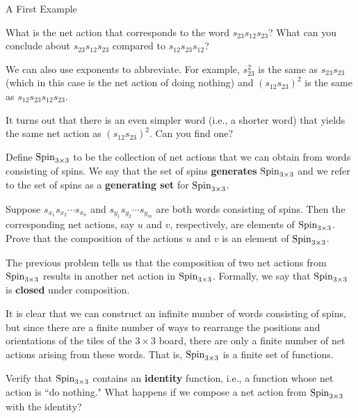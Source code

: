 \begin{section}{A First Example}
\begin{problem}
What is the net action that corresponds to the word $s_{23} s_{12} s_{23}$? What can you conclude about $s_{23} s_{12} s_{23}$ compared to 
$s_{12} s_{23} s_{12}$?
\end{problem}

We can also use exponents to abbreviate.  For example, $s_{23}^2$ is the same as $s_{23} s_{23}$ (which in this case is the net action of doing nothing) and $(s_{12} s_{23})^2$ is the same as $s_{12} s_{23} s_{12} s_{23}$.

\begin{problem}\label{prob:braid_relation}
It turns out that there is an even simpler word (i.e., a shorter word) that yields the same net action as $(s_{12} s_{23})^2$. Can you find one?
\end{problem}

Define $\operatorname{Spin}_{3\times 3}$ to be the collection of net actions that we can obtain from words consisting of spins.  We say that the set of spins \textbf{generates} $\operatorname{Spin}_{3\times 3}$ and we refer to the set of spins as a \textbf{generating set} for $\operatorname{Spin}_{3\times 3}$.  

\begin{problem}
Suppose $s_{x_1}s_{x_2}\cdots s_{x_n}$ and $s_{y_1}s_{y_2}\cdots s_{y_m}$ are both words consisting of spins. Then the corresponding net actions, say $u$ and $v$, respectively, are elements of $\operatorname{Spin}_{3\times 3}$. Prove that the composition of the actions $u$ and $v$ is an element of $\operatorname{Spin}_{3\times 3}$.
\end{problem}

The previous problem tells us that the composition of two net actions from $\operatorname{Spin}_{3\times 3}$ results in another net action in $\operatorname{Spin}_{3\times 3}$. Formally, we say that $\operatorname{Spin}_{3\times 3}$ is \textbf{closed} under composition.

It is clear that we can construct an infinite number of words consisting of spins, but since there are a finite number of ways to rearrange the positions and orientations of the tiles of the $3\times 3$ board, there are only a finite number of net actions arising from these words.  That is, $\operatorname{Spin}_{3\times 3}$ is a finite set of functions.

\begin{problem}
Verify that $\operatorname{Spin}_{3\times 3}$ contains an \textbf{identity} function, i.e., a function whose net action is ``do nothing." What happens if we compose a net action from $\operatorname{Spin}_{3\times 3}$ with the identity?
\end{problem}


\end{section}
